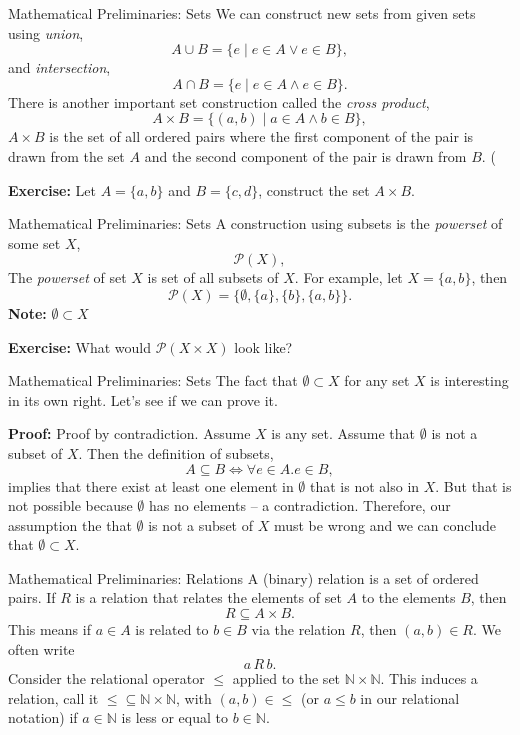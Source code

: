 \documentclass{beamer}
\begin{document}
\begin{frame}{\large Mathematical  Preliminaries: Sets}
We can construct new sets from given sets using {\em union},
\[
A \cup B = \{ e \mid e\in A \vee e \in B\},
\]
 and {\em intersection},
\[
A \cap B = \{ e \mid  e\in A \wedge e \in B\}.
\]
There is another important set construction called the {\em cross product},
\[
A\times B = \{ (a,b) \mid  a\in A \wedge b\in B\},
\]
$A\times B$ is the set of all ordered pairs where the first component of the pair is drawn from
the set $A$ and the second component of the pair is drawn from $B$. (

{\bf Exercise:} Let $A=\{a,b\}$ and $B=\{c,d\}$, construct the set $A\times B$.

\end{frame}

\begin{frame}{\large Mathematical  Preliminaries: Sets}
A construction using subsets is the {\em powerset} of some set $X$,
\[
{\mathcal P}(X),
\]
The {\em powerset} of set $X$ is set of all subsets of $X$.  For example,
let $X = \{a,b\}$, then
\[
{\mathcal P}(X) = \{ \emptyset, \{a\}, \{b\}, \{a,b\} \}.
\]
{\bf Note:} $\emptyset \subset X$

\vspace{.1in}

{\bf Exercise:} What would ${\mathcal P}(X\times X)$ look like?

\end{frame}

\begin{frame}{\large Mathematical  Preliminaries: Sets}
\scriptsize
The fact that $\emptyset \subset X$ for any set $X$ is interesting in its own right.  Let's see if we can prove it.

\vspace{.1in}

{\bf Proof:} Proof by contradiction. Assume $X$ is any set. Assume that $\emptyset$ is not a subset of $X$.
Then the definition of subsets,
\[
A \subseteq B \Leftrightarrow \forall e \in A. e \in B,
\]
implies that there exist at least one element in $\emptyset$ that is not also in $X$.  But that is not possible
because $\emptyset$ has no elements -- a contradiction.  Therefore, our assumption the
that $\emptyset$ is not a subset of $X$ must be wrong and we can conclude that $\emptyset \subset X$.

\end{frame}


\begin{frame}{\large Mathematical  Preliminaries: Relations}
A (binary) relation is a set of ordered pairs.  If $R$ is a relation that relates the elements of
set $A$ to the elements $B$, then
\[
R \subseteq A\times B.
\]
This means if $a\in A$ is related to $b\in B$ via the relation $R$, then $(a,b)\in R$.  We often
write
\[
a\, R\, b.
\]
Consider the relational operator $\le$ applied to the set ${\mathbb N}\times {\mathbb N}$.
This induces a relation, call it $\le \subseteq {\mathbb N}\times {\mathbb N}$, with 
$(a,b) \in \le$ (or $a \le b$ in our relational notation) if $a\in{\mathbb N}$ is less or equal to $b\in{\mathbb N}$.
\end{frame}
\end{document}
